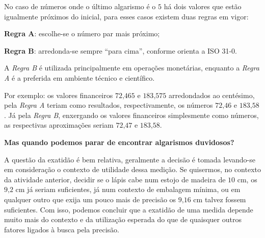 No caso de números onde o último algarismo é o $5$ há dois valores que estão igualmente próximos do inicial, para esses casos existem duas regras em vigor:

\textbf{Regra A}: escolhe-se o número par mais próximo;

\textbf{Regra B}: arredonda-se sempre “para cima”, conforme orienta a ISO 31-0.

A \emph{Regra B} é utilizada principalmente em operações monetárias, enquanto a \emph{Regra A} é a preferida em ambiente técnico e científico.

Por exemplo: os valores financeiros $72\text{,}465$ e $183\text{,}575$ arredondados ao centésimo, pela \emph{Regra A} teriam como resultados, respectivamente, os números $72\text{,}46$ e $183\text{,}58$. Já pela \emph{Regra B}, enxergando os valores financeiros simplesmente como números, as respectivas aproximações seriam $72\text{,}47$ e $183\text{,}58$.

\textbf{Mas quando podemos parar de encontrar algarismos duvidosos?}

A questão da exatidão é bem relativa, geralmente a decisão é tomada levando-se em consideração o contexto de utilidade dessa medição. Se quisermos, no contexto da atividade anterior, decidir se o lápis cabe num estojo de madeira de $10$ cm, os $9\text{,}2$ cm já seriam suficientes, já num contexto de embalagem mínima, ou em qualquer outro que exija um pouco mais de precisão os $9\text{,}16$ cm talvez fossem suficientes. Com isso, podemos concluir que a exatidão de uma medida depende muito mais do contexto e da utilização esperada do que de quaisquer outros fatores ligados à busca pela precisão.

